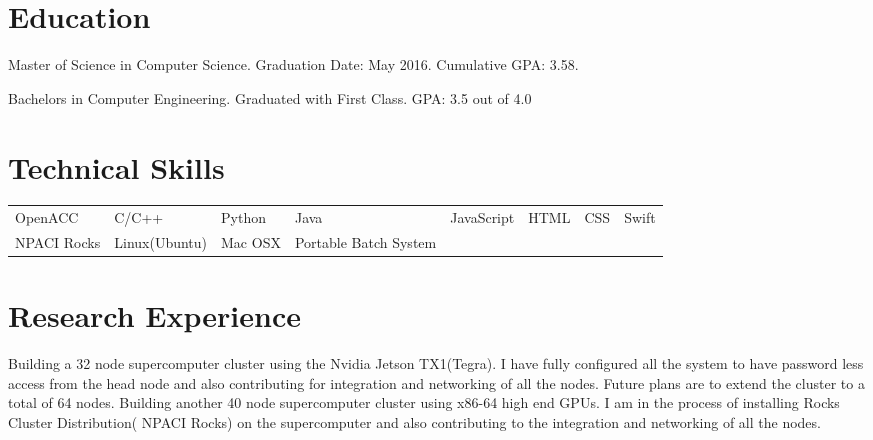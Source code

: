 \documentclass{Mihir_Kavatkar-Resume}
\begin{document}
	
	\section{Education}
		\educationinfoMasters
		{Master of Science in Computer Science.}
		{Graduation Date: May 2016.}
		{Cumulative GPA: 3.58.}
		
		\vspace*{-0.5em}
		\educationinfoBachelors
		{Bachelors in Computer Engineering. Graduated with First Class. GPA: 3.5 out of 4.0}
		
	
	\section{Technical Skills}
		\begin{tabular}{l l l l l l l l}
			OpenACC & C/C++ & Python & Java & JavaScript & HTML & CSS & Swift \\
			NPACI Rocks & Linux(Ubuntu) & Mac OSX & Portable Batch System
		\end{tabular}
	
	\section{Research Experience}
		\vspace*{-0.5em}
		\workitems
		{Building a 32 node supercomputer cluster using the Nvidia Jetson TX1(Tegra). I have fully configured all the system to have password less access from the head node and also contributing for integration and networking of all the nodes. Future plans are to extend the cluster to a total of 64 nodes. }
		{Building another 40 node supercomputer cluster using x86-64 high end GPUs. I am in the process of installing Rocks Cluster Distribution( NPACI Rocks) on the supercomputer and also contributing to the integration and networking of all the nodes.}
		
\end{document}
